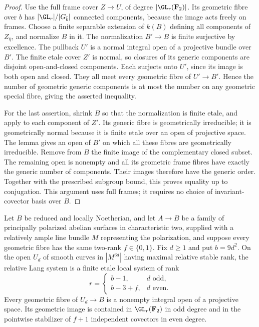 \begin{proof}
Use the full frame cover $Z\to U$, of degree
$|\GL_r(\mathbf F_2)|$. Its geometric fibre over $b$ has
$|\GL_r|/|G_{\bar b}|$ connected components, because the
image acts freely on frames. Choose a finite separable
extension of $k(B)$ defining all components of
$Z_{\bar\eta}$, and normalize $B$ in it. The normalization
$B'\to B$ is finite surjective by excellence. The pullback
$U'$ is a normal integral open of a projective bundle over
$B'$. The finite etale cover $Z'$ is normal, so closures of
its generic components are disjoint open-and-closed
components. Each surjects onto $U'$, since its image is both
open and closed. They all meet every geometric fibre of
$U'\to B'$. Hence the number of geometric generic components
is at most the number on any geometric special fibre,
giving the asserted inequality.

For the last assertion, shrink $B$ so that the normalization
is finite etale, and apply
\cite[Lemma~37.27.5]{Stacks0559} to each component of $Z'$.
Its generic fibre is geometrically irreducible; it is
geometrically normal because it is finite etale over an open
of projective space. The lemma gives an open of $B'$ on
which all these fibres are geometrically irreducible.
Remove from $B$ the finite image of the complementary
closed subset. The remaining open is nonempty and all its
geometric frame fibres have exactly the generic number of
components. Their images therefore have the generic order.
Together with the prescribed subgroup bound, this proves
equality up to conjugation. This argument uses full frames;
it requires no choice of invariant-covector basis over $B$.
\end{proof}

\begin{lemma}
\label{lem:ppav-family-constant-rank-Lang-candidate}
Let $B$ be reduced and locally Noetherian, and let $A\to B$
be a family of principally polarized abelian
surfaces in characteristic two, supplied with a relatively
ample line bundle $M$ representing the polarization, and
suppose every geometric fibre has the same two-rank
$f\in\{0,1\}$. Fix $d\ge1$ and put $b=9d^2$.
On the open $U_d$ of smooth curves in $|M^{3d}|$ having
maximal relative stable rank, the relative Lang system is a
finite etale local system of rank
\[
 r=\begin{cases}b-1,&d\text{ odd},\\ b-3+f,&d\text{ even}.
 \end{cases}
\]
Every geometric fibre of $U_d\to B$ is a nonempty integral
open of a projective space. Its geometric image is contained
in $\GL_r(\mathbf F_2)$ in odd degree and in the pointwise
stabilizer of $f+1$ independent covectors in even degree.
\end{lemma}


